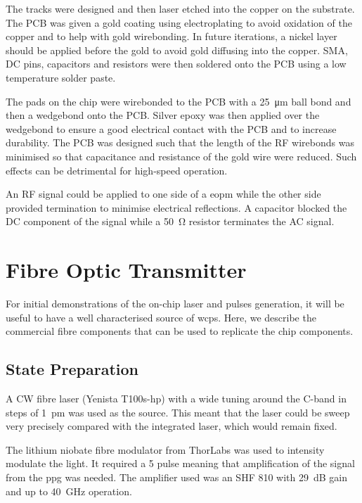 The tracks were designed and then laser etched into the copper on the substrate. The PCB was given a gold coating using electroplating to avoid oxidation of the copper and to help with gold wirebonding. In future iterations, a nickel layer should be applied before the gold to avoid gold diffusing into the copper. SMA, DC pins, capacitors and resistors were then soldered onto the PCB using a low temperature solder paste.

The pads on the chip were wirebonded to the PCB with a \SI{25}{\micro\meter} ball bond and then a wedgebond onto the PCB. Silver epoxy was then applied over the wedgebond to ensure a good electrical contact with the PCB and to increase durability. The PCB was designed such that the length of the RF wirebonds was minimised so that capacitance and resistance of the gold wire were reduced. Such effects can be detrimental for high-speed operation.

An RF signal could be applied to one side of a \ac{eopm} while the other side provided termination to minimise electrical reflections. A capacitor blocked the DC component of the signal while a \SI{50}{\ohm} resistor terminates the AC signal. 

\section{Fibre Optic Transmitter}

For initial demonstrations of the on-chip laser and pulses generation, it will be useful to have a well characterised source of \acp{wcp}. Here, we describe the commercial fibre components that can be used to replicate the chip components.

\subsection{State Preparation}

A \ac{CW} fibre laser (Yenista T100s-hp) with a wide tuning around the C-band in steps of \SI{1}{\pm} was used as the source. This meant that the laser could be sweep very precisely compared with the integrated laser, which would remain fixed. 

The lithium niobate fibre modulator from ThorLabs was used to intensity modulate the light. It required a \SI{5}{\Vpp} pulse meaning that amplification of the signal from the \ac{ppg} was needed. The amplifier used was an SHF 810 with \SI{29}{dB} gain and up to \SI{40}{\GHz} operation.

